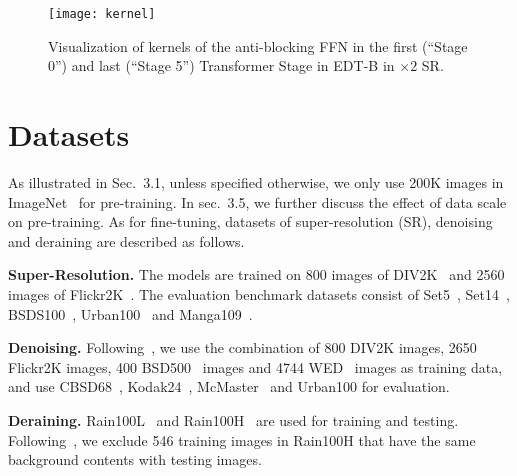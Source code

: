 \documentclass[runningheads]{llncs}
\begin{document}
	\begin{figure}[t]
		\begin{center}
			\texttt{[image: kernel]}
		\end{center}
		\vspace{-0.2in}
		\caption{Visualization of kernels of the anti-blocking FFN in the first (``Stage 0'') and last (``Stage 5'') Transformer Stage in EDT-B in $\times 2$ SR.}
		\label{fig:kernel}
		\vspace{-0.05in}
	\end{figure}
	


	\section{Datasets}
	
	As illustrated in Sec.~{3.1}, unless specified otherwise, we only use 200K images in ImageNet~\cite{deng2009imagenet} for pre-training. In sec.~{3.5}, we further discuss the effect of data scale on pre-training. As for fine-tuning, datasets of super-resolution (SR), denoising and deraining are described as follows.
	
	\vspace{0.05in}
	\noindent\textbf{Super-Resolution.} The models are trained on 800 images of DIV2K~\cite{agustsson2017ntire} and 2560 images of Flickr2K~\cite{timofte2017ntire}. The evaluation benchmark datasets consist of Set5~\cite{bevilacqua2012low}, Set14~\cite{zeyde2010single}, BSDS100~\cite{martin2001database}, Urban100~\cite{huang2015single} and Manga109~\cite{matsui2017sketch}.
	
	\vspace{0.05in}
	\noindent\textbf{Denoising.} Following~\cite{zhang2020residual,zhang2021plug,liang2021swinir}, we use the combination of 800 DIV2K images, 2650 Flickr2K images, 400 BSD500~\cite{arbelaez2010contour} images and 4744 WED~\cite{ma2016waterloo} images as training data, and use CBSD68~\cite{martin2001database}, Kodak24~\cite{richdodak}, McMaster~\cite{zhang2011color} and Urban100 for evaluation.
	
	\vspace{0.05in}
	\noindent\textbf{Deraining.} Rain100L~\cite{yang2019joint} and Rain100H~\cite{yang2019joint} are used for training and testing. Following~\cite{ren2019progressive}, we exclude 546 training images in Rain100H that have the same background contents with testing images.
	
\end{document}
